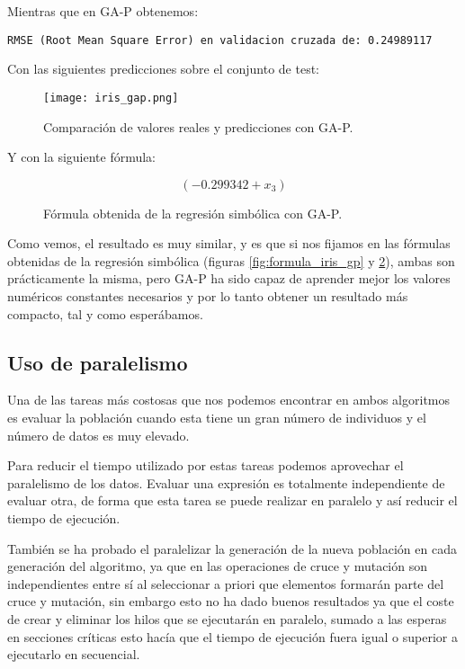 Mientras que en GA-P obtenemos:

\begin{lstlisting}
RMSE (Root Mean Square Error) en validacion cruzada de: 0.24989117
\end{lstlisting}

Con las siguientes predicciones sobre el conjunto de test:

\begin{figure}[H]
	 \centering
	 \texttt{[image: iris\_gap.png]}
	 \caption{Comparación de valores reales y predicciones con GA-P.}
	\label{fig:iris_gap}
\end{figure}

Y con la siguiente fórmula:

\begin{figure}[H]
	 \centering
	 $$( -0.299342  +  x_3 )$$
	 \caption{Fórmula obtenida de la regresión simbólica con GA-P.}
	\label{fig:formula_iris_gap}
\end{figure}

Como vemos, el resultado es muy similar, y es que si nos fijamos en las fórmulas obtenidas de la regresión simbólica (figuras \ref{fig:formula_iris_gp} y \ref{fig:formula_iris_gap}), ambas son prácticamente la misma, pero GA-P ha sido capaz de aprender mejor los valores numéricos constantes necesarios y por lo tanto obtener un resultado más compacto, tal y como esperábamos.

\newpage

\subsection{Uso de paralelismo}

Una de las tareas más costosas que nos podemos encontrar en ambos algoritmos es evaluar la población cuando esta tiene un gran número de individuos y el número de datos es muy elevado.

Para reducir el tiempo utilizado por estas tareas podemos aprovechar el paralelismo de los datos. Evaluar una expresión es totalmente independiente de evaluar otra, de forma que esta tarea se puede realizar en paralelo y así reducir el tiempo de ejecución.

También se ha probado el paralelizar la generación de la nueva población en cada generación del algoritmo, ya que en las operaciones de cruce y mutación son independientes entre sí al seleccionar a priori que elementos formarán parte del cruce y mutación, sin embargo esto no ha dado buenos resultados ya que el coste de crear y eliminar los hilos que se ejecutarán en paralelo, sumado a las esperas en secciones críticas esto hacía que el tiempo de ejecución fuera igual o superior a ejecutarlo en secuencial.

\newpage
